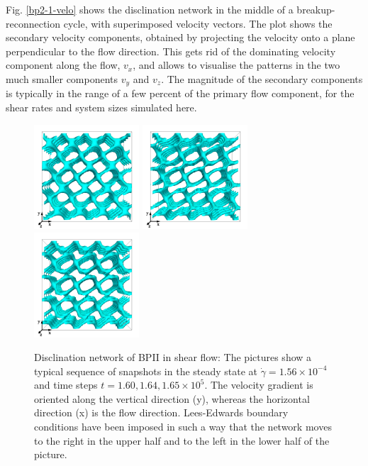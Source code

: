\documentclass[8.5pt,twoside,twocolumn]{article}
\newcommand{\e}[1]{\times10^{#1}}
\newcommand{\gd}{\dot{\gamma}}
\begin{document}
Fig. \ref{bp2-1-velo} shows the disclination network in the middle of a breakup-reconnection
cycle, with superimposed velocity vectors.
The plot shows the secondary velocity components, obtained by projecting the
velocity onto a plane perpendicular to the flow direction.
This gets rid of the dominating velocity component along the flow, $v_x$, and 
allows to visualise the patterns in the 
two much smaller components $v_y$ and $v_z$.
The magnitude of the secondary components is typically in the range of a 
few percent of the primary flow component, for the shear rates 
and system sizes simulated here.

\begin{figure}[htpb]
\center
\includegraphics[width=0.35\textwidth]{disc-160k_run902r.png}
\includegraphics[width=0.35\textwidth]{disc-164k_run902r.png}
\includegraphics[width=0.35\textwidth]{disc-165k_run902r.png}
\caption{Disclination network of BPII in shear flow: 
The pictures show a typical sequence of snapshots in the steady state 
at $\gd=1.56\e{-4}$ and time steps $t=1.60, 1.64,1.65\e{5}$. The velocity 
gradient is oriented along the vertical direction (y), whereas the 
horizontal direction (x) is the flow direction. Lees-Edwards boundary 
conditions have been imposed in such a way that the network moves to the 
right in the upper half and to the left in the lower half of the picture.}
\label{bp2-1-disc}
\end{figure}
\end{document}
